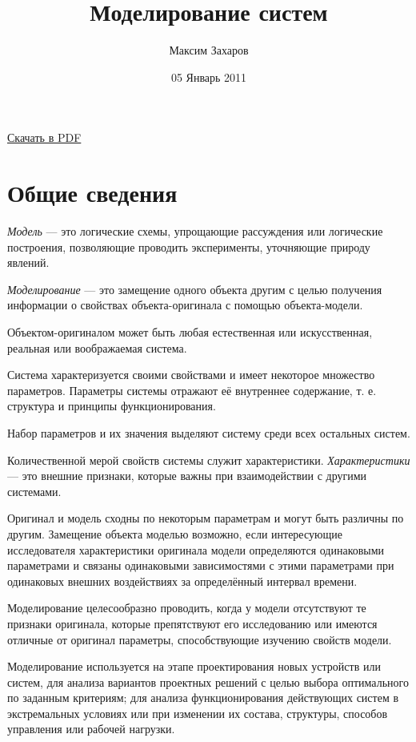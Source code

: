 \documentclass[12pt, russian, oneside, article]{ncc}
\begin{document}
\title{Моделирование систем}
\author{Максим Захаров}
\date{05 Январь 2011}
\maketitle

\setcounter{tocdepth}{3}
\tableofcontents
\vspace*{1cm}

\href{file:///home/maxim/Documents/Git/lectures/other/MS_Lectures.pdf}{Скачать в PDF}

\section{Общие сведения}
\label{sec-1}


\emph{Модель} --- это логические схемы, упрощающие рассуждения или логические построения, позволяющие проводить эксперименты, уточняющие природу явлений.

\emph{Моделирование} --- это замещение одного объекта другим с целью получения информации о свойствах объекта-оригинала с помощью объекта-модели.

Объектом-оригиналом может быть любая естественная или искусственная, реальная или воображаемая система.

Система характеризуется своими свойствами и имеет некоторое множество параметров. Параметры системы отражают её внутреннее содержание, т. е. структура и принципы функционирования.

Набор параметров и их значения выделяют систему среди всех остальных систем.

Количественной мерой свойств системы служит характеристики. \emph{Характеристики} --- это внешние признаки, которые важны при взаимодействии с другими системами.

Оригинал и модель сходны по некоторым параметрам и могут быть различны по другим. Замещение объекта моделью возможно, если интересующие исследователя характеристики оригинала модели определяются одинаковыми параметрами и связаны одинаковыми зависимостями с этими параметрами при одинаковых внешних воздействиях за определённый интервал времени.

Моделирование целесообразно проводить, когда у модели отсутствуют те признаки оригинала, которые препятствуют его исследованию или имеются отличные от оригинал параметры, способствующие изучению свойств модели.

Моделирование используется на этапе проектирования новых устройств или систем, для анализа вариантов проектных решений с целью выбора оптимального по заданным критериям; для анализа функционирования действующих систем в экстремальных условиях или при изменении их состава, структуры, способов управления или рабочей нагрузки.
\end{document}
